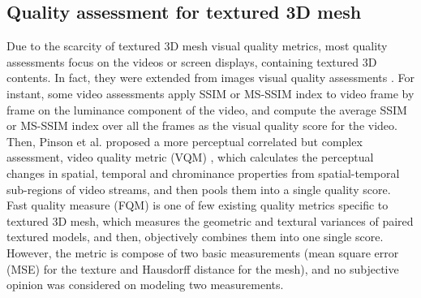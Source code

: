 \subsection{Quality assessment for textured 3D mesh}
Due to the scarcity of textured 3D mesh visual quality metrics, most quality assessments focus on the videos or screen displays, containing textured 3D contents. In fact, they were extended from images visual quality assessments \cite{Seshadrinathan_2010}. For instant, some video assessments \cite{Zhou_Wang} apply SSIM or MS-SSIM index to video frame by frame on the luminance component of the video, and compute the average SSIM or MS-SSIM index over all the frames as the visual quality score for the video. Then, Pinson et al. proposed a more perceptual correlated but complex assessment, video quality metric (VQM) \cite{Pinson_2004}, which calculates the perceptual changes in spatial, temporal and chrominance properties from spatial-temporal sub-regions of video streams, and then pools them into a single quality score.  Fast quality measure (FQM) \cite{Tian_2004} is one of few existing quality metrics specific to textured 3D mesh, which measures the geometric and textural variances of paired textured models, and then, objectively combines them into one single score. However, the metric is compose of two basic measurements (mean square error (MSE) for the texture and Hausdorff distance for the mesh), and no subjective opinion was considered on modeling two measurements.
